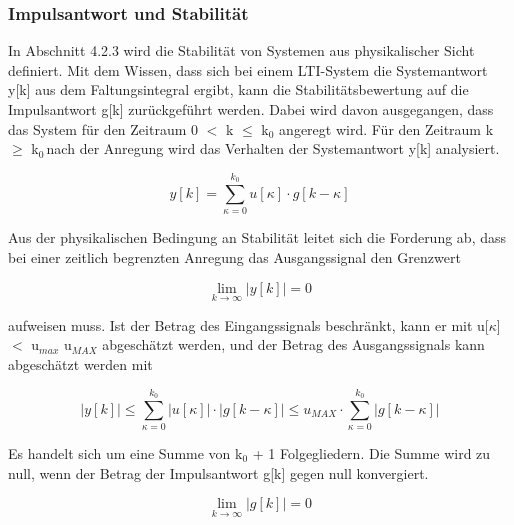 \subsubsection{Impulsantwort und Stabilit\"{a}t}

\noindent In Abschnitt 4.2.3 wird die Stabilit\"{a}t von Systemen aus physikalischer Sicht definiert. Mit dem Wissen, dass sich bei einem LTI-System die Systemantwort y[k] aus dem Faltungsintegral ergibt, kann die Stabilit\"{a}tsbewertung auf die Impulsantwort g[k] zur\"{u}ckgef\"{u}hrt werden. Dabei wird davon ausgegangen, dass das System f\"{u}r den Zeitraum 0 $\mathrm{<}$ k $\leq$ k${}_{0}$ angeregt wird. F\"{u}r den Zeitraum k $\geq$ k${}_{0\ }$nach der Anregung wird das Verhalten der Systemantwort y[k] analysiert.

\begin{equation}\label{eq:fourninetyseven}
y\left[k\right]=\sum _{\kappa =0}^{k_{0} }u\left[\kappa \right]\cdot g\left[k-\kappa \right]
\end{equation}

\noindent Aus der physikalischen Bedingung an Stabilit\"{a}t leitet sich die Forderung ab, dass bei einer zeitlich begrenzten Anregung das Ausgangssignal den Grenzwert 

\begin{equation}\label{eq:fourninetyeight}
{\mathop{\lim }\limits_{k\to \infty }} \left|y\left[k\right]\right|=0
\end{equation}

\noindent aufweisen muss. Ist der Betrag des Eingangssignals beschr\"{a}nkt, kann er mit {\textbar}u[$\kappa$]{\textbar} $\mathrm{<}$ u${}_{max}$ u${}_{MAX}$ abgesch\"{a}tzt werden, und der Betrag des Ausgangssignals kann abgesch\"{a}tzt werden mit

\begin{equation}\label{eq:fourninetynine}
\left|y\left[k\right]\right|\le \sum _{\kappa =0}^{k_{0} }\left|u\left[\kappa \right]\right|\cdot \left|g\left[k-\kappa \right]\right| \le u_{MAX} \cdot \sum _{\kappa =0}^{k_{0} }\left|g\left[k-\kappa \right]\right|
\end{equation}

\noindent Es handelt sich um eine Summe von k${}_{0}$ + 1 Folgegliedern. Die Summe wird zu null, wenn der Betrag der Impulsantwort g[k] gegen null konvergiert.

\begin{equation}\label{eq:fouronehundred}
{\mathop{\lim }\limits_{k\to \infty }} \left|g\left[k\right]\right|=0
\end{equation}

